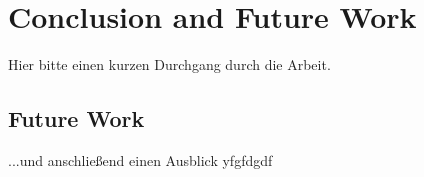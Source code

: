 \chapter{Conclusion and Future Work}
\label{chap:conclusion}
Hier bitte einen kurzen Durchgang durch die Arbeit.

\section*{Future Work}
...und anschließend einen Ausblick  yfgfdgdf \cite{WSPA}

